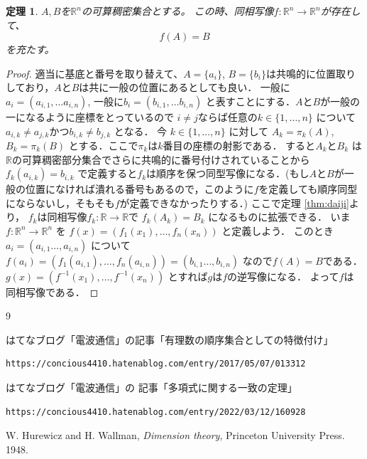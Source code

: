 \documentclass[leqno, a4paper, 12pt]{jsarticle}
\newtheorem{thm}{定理}
\newcommand{\rr}{\mathbb{R}}
\begin{document}
\begin{thm}
$A,B$を$\rr^n$の可算稠密集合とする。
この時、同相写像$f:\rr^n\to \rr^n$が存在して、
\[
f(A)=B
\]
を充たす。
\end{thm}
\begin{proof}
適当に基底と番号を取り替えて、$A=\{a_{i}\}$, $B=\{b_{i}\}$は共鳴的に位置取りしており，$A$と$B$は共に一般の位置にあるとしても良い．
一般に$a_{i}=(a_{i, 1}, \dots a_{i, n})$, 
一般に$b_{i}=(b_{i, 1}, \dots b_{i, n})$
と表すことにする．$A$と$B$が一般の一になるように座標をとっているので
$i\neq j$ならば任意の$k\in \{1, \dots, n\}$
について
$a_{i, k}\neq a_{j, k}$かつ$b_{i, k}\neq b_{j, k}$
となる．
今
$k\in \{1, \dots, n\}$
に対して
$A_{k}=\pi_{k}(A)$, 
$B_{k}=\pi_{k}(B)$
とする．ここで$\pi_{k}$は$k$番目の座標の射影である．
すると$A_{k}$と$B_{k}$
は$\rr$の可算稠密部分集合でさらに共鳴的に番号付けされていることから$f_{k}(a_{i, k})=b_{i, k}$
で定義すると$f_{k}$は順序を保つ同型写像になる．(もし$A$と$B$が一般の位置になければ潰れる番号もあるので，このように$f$を定義しても順序同型にならないし，そもそも$f$が定義できなかったりする．)
ここで定理 \ref{thm:daiji}より，
$f_{k}$は同相写像$f_{k}: \rr\to \rr$で
$f_{k}(A_{k})=B_{k}$
になるものに拡張できる．
いま
$f: \rr^{n}\to \rr^{n}$
を
$f(x)=(f_{1}(x_{1}), \dots, f_{n}(x_{n}))$
と定義しよう．
このとき$a_{i}=(a_{i, 1}\dots, a_{i, n})$
について
$f(a_{i})=
(f_{1}(a_{i, 1}), \dots, f_{n}(a_{i, n}))
=(b_{i, 1}\dots, b_{i, n})$
なので$f(A)=B$である．
$g(x)=(f^{-1}(x_{1}), \dots, f^{-1}(x_{n}))$
とすれば$g$は$f$の逆写像になる．
よって$f$は同相写像である．
\end{proof}






































	
\begin{thebibliography}{9}


はてなブログ「電波通信」の記事「有理数の順序集合としての特徴付け」
\begin{verbatim}
https://concious4410.hatenablog.com/entry/2017/05/07/013312
\end{verbatim}
はてなブログ「電波通信」の
記事「多項式に関する一致の定理」
\begin{verbatim}
https://concious4410.hatenablog.com/entry/2022/03/12/160928
\end{verbatim}
W. Hurewicz and H. Wallman, 
\textit{Dimension theory}, Princeton University Press. 1948. 

\end{thebibliography}




			
\end{document}
